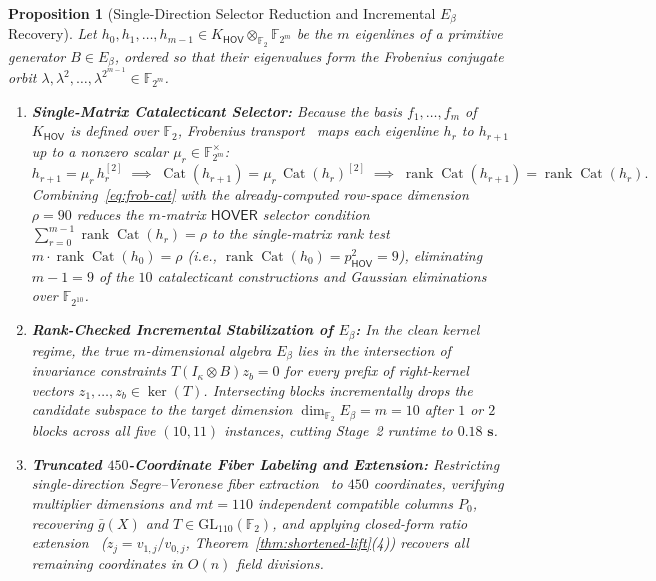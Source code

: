 \documentclass[11pt,a4paper]{article}
\newtheorem{proposition}{Proposition}
\theoremstyle{definition}
\theoremstyle{remark}
\newcommand{\F}{\mathbb{F}}
\newcommand{\rk}{\operatorname{rank}}
\newcommand{\Cat}{\operatorname{Cat}}
\newcommand{\HOV}{\mathsf{HOV}}
\newcommand{\HOVER}{\mathsf{HOVER}}
\begin{document}
\begin{proposition}[Single-Direction Selector Reduction and Incremental $E_\beta$ Recovery]
\label{prop:hover-frob}
Let $h_0, h_1, \dots, h_{m-1} \in K_{\HOV} \otimes_{\F_2} \F_{2^m}$ be the $m$ eigenlines of a primitive generator $B \in E_\beta$, ordered so that their eigenvalues form the Frobenius conjugate orbit $\lambda, \lambda^2, \dots, \lambda^{2^{m-1}} \in \F_{2^m}$.
\begin{enumerate}[leftmargin=2em]
    \item \textbf{Single-Matrix Catalecticant Selector:}
    Because the basis $f_1, \dots, f_m$ of $K_{\HOV}$ is defined over $\F_2$, Frobenius transport~\cite{Saa26a} maps each eigenline $h_r$ to $h_{r+1}$ up to a nonzero scalar $\mu_r \in \F_{2^m}^\times$:
    \begin{equation}
    \label{eq:frob-cat}
        h_{r+1} = \mu_r\,h_r^{[2]}
        \;\implies\;
        \Cat(h_{r+1}) = \mu_r\,\Cat(h_r)^{[2]}
        \;\implies\;
        \rk\Cat(h_{r+1}) = \rk\Cat(h_r).
    \end{equation}
    Combining~\eqref{eq:frob-cat} with the already-computed row-space dimension $\rho = 90$ reduces the $m$-matrix $\HOVER$ selector condition $\sum_{r=0}^{m-1} \rk\Cat(h_r) = \rho$ to the single-matrix rank test $m \cdot \rk\Cat(h_0) = \rho$ (i.e., $\rk\Cat(h_0) = p_{\HOV}^2 = 9$), eliminating $m - 1 = 9$ of the $10$ catalecticant constructions and Gaussian eliminations over $\F_{2^{10}}$.
    \item \textbf{Rank-Checked Incremental Stabilization of $E_\beta$:}
    In the clean kernel regime, the true $m$-dimensional algebra $E_\beta$ lies in the intersection of invariance constraints $T(I_\kappa \otimes B)z_b = 0$ for every prefix of right-kernel vectors $z_1, \dots, z_b \in \ker(T)$. Intersecting blocks incrementally drops the candidate subspace to the target dimension $\dim_{\F_2} E_\beta = m = 10$ after $1$ or $2$ blocks across all five $(10, 11)$ instances, cutting Stage~2 runtime to $\mathbf{0.18\text{ s}}$.
    \item \textbf{Truncated $450$-Coordinate Fiber Labeling and Extension:}
    Restricting single-direction Segre--Veronese fiber extraction~\cite{Saa26a} to $450$ coordinates, verifying multiplier dimensions and $mt = 110$ independent compatible columns $P_0$, recovering $\bar{g}(X)$ and $T \in \mathrm{GL}_{110}(\F_2)$, and applying closed-form ratio extension~\cite{KM23,Saa26a} ($z_j = v_{1, j} / v_{0, j}$, Theorem~\ref{thm:shortened-lift}(4)) recovers all remaining coordinates in $O(n)$ field divisions.
\end{enumerate}
\end{proposition}
\end{document}
